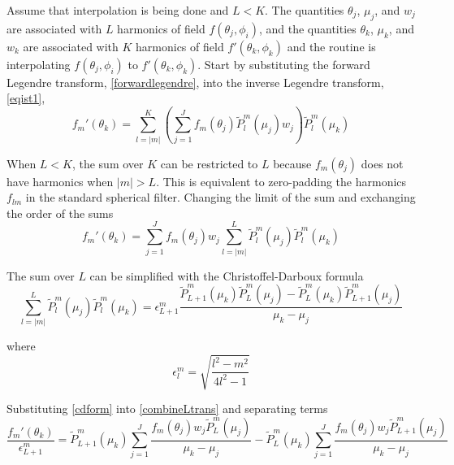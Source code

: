 Assume that interpolation is being done and $L < K$.  The quantities $\theta_j$, $\mu_j$, and $w_j$ are associated with $L$ harmonics of field $f(\theta_j,\phi_i)$, and the quantities $\theta_k$, $\mu_k$, and $w_k$ are associated with $K$ harmonics of field $f'(\theta_k,\phi_k)$ and the routine is interpolating $f(\theta_j,\phi_i)$ to $f'(\theta_k,\phi_k)$. Start by substituting the forward Legendre transform, \eqref{forwardlegendre}, into the inverse Legendre transform, \eqref{eqist1}, 
\begin{equation}
f_m'(\theta_k) = \sum_{l = \vert m \vert}^{K} \left(\sum_{j=1}^J f_m(\theta_j)\widetilde{P}_l^m(\mu_j)w_j\right) \widetilde{P}_l^m(\mu_k)
\end{equation}

When $L<K$, the sum over $K$ can be restricted to $L$ because $f_m(\theta_j)$ does not have harmonics when $\vert m\vert> L$.  This is equivalent to zero-padding the harmonics $f_{lm}$ in the standard spherical filter. Changing the limit of the sum and exchanging the order of the sums
\begin{equation}
f_m'(\theta_k) = \sum_{j=1}^J f_m(\theta_j)w_j \sum_{l = \vert m \vert}^{L} \widetilde{P}_l^m(\mu_j) \widetilde{P}_l^m(\mu_k) \label{combineLtrans}
\end{equation}



The sum over $L$ can be simplified with the Christoffel-Darboux formula 
\begin{equation}
\sum_{l = \vert m \vert}^{L} \widetilde{P}_l^m(\mu_j) \widetilde{P}_l^m(\mu_k) = \epsilon_{L+1}^m \dfrac{ \widetilde{P}_{L+1}^m(\mu_k)  \widetilde{P}_L^m(\mu_j) - \widetilde{P}_{L}^m(\mu_k)  \widetilde{P}_{L+1}^m(\mu_j)}{\mu_k - \mu_j} \label{cdform}
\end{equation}

where
\begin{equation}
\epsilon_{l}^m  = \sqrt{\dfrac{l^2 - m^2}{4l^2 - 1}}
\end{equation}

Substituting \eqref{cdform} into \eqref{combineLtrans} and separating terms
%
\begin{equation}
\dfrac{f_m'(\theta_k)}{\epsilon_{L+1}^m} = \widetilde{P}_{L+1}^m(\mu_k)\sum_{j=1}^J \dfrac{f_m(\theta_j)w_j\widetilde{P}_L^m(\mu_j)}{\mu_k - \mu_j}   - \widetilde{P}_{L}^m(\mu_k)\sum_{j=1}^J \dfrac{f_m(\theta_j)w_j\widetilde{P}_{L+1}^m(\mu_j)}{\mu_k - \mu_j}  \label{cdform2}
\end{equation}

